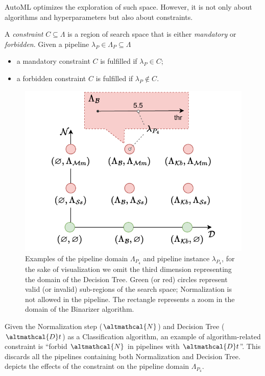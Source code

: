 AutoML optimizes the exploration of such space.
However, it is not only about algorithms and hyperparameters but also about constraints.

\begin{definition}[Constraint]\label{constraints}
A \emph{constraint} $C \subseteq \Lambda$ is a region of search space that is either \emph{mandatory} or \emph{forbidden}.
Given a pipeline $\lambda_P \in \Lambda_P \subseteq \Lambda$
\begin{itemize}
    \item a mandatory constraint $C$ is fulfilled if  $\lambda_P \in C$;
    \item a forbidden constraint $C$ is fulfilled if  $\lambda_P \notin C$.
\end{itemize}
\end{definition}

\begin{figure}
    \centering
    \includegraphics[scale=.75]{chapters/human-centric/hamlet/img/toy_example_ss.pdf}
    \caption{Examples of the pipeline domain $\Lambda_{P_4}$ and pipeline instance $\lambda_{P_4}$, for the sake of visualization we omit the third dimension representing the domain of the Decision Tree. Green (or red) circles represent valid (or invalid) sub-regions of the search space; Normalization is not allowed in the pipeline. The rectangle represents a zoom in the domain of the Binarizer algorithm.}
    \label{hamlet-fig:space}
\end{figure}


\begin{example}[Constraint]
Given the Normalization step ($\altmathcal{N}$) and Decision Tree ($\altmathcal{D}t$) as a Classification algorithm, an example of algorithm-related constraint is ``forbid $\altmathcal{N}$ in pipelines with $\altmathcal{D}t$''.
This discards all the pipelines containing both Normalization and Decision Tree.
 depicts the effects of the constraint on the pipeline domain $\Lambda_{P_4}$.
\label{ex:constraints}
\end{example}

